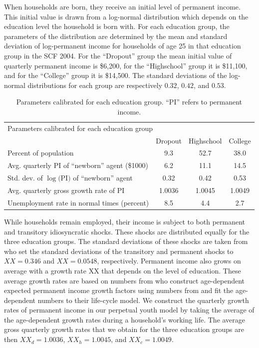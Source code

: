 \documentclass[11pt]{article}
\begin{document}
When households are born, they receive an initial level of permanent income. This initial value is drawn from a log-normal distribution which depends on the education level the household is born with. For each education group, the parameters of the distribution are determined by the mean and standard deviation of log-permanent income for households of age 25 in that education group in the SCF 2004. For the ``Dropout'' group the mean initial value of quarterly permanent income is \$6,200, for the ``Highschool'' group it is \$11,100, and for the ``College'' group it is \$14,500. The standard deviations of the log-normal distributions for each group are respectively $0.32$, $0.42$, and $0.53$. 

\begin{table}[th]
\begin{center}
	\begin{tabular}{lccc}
		\toprule 
		\multicolumn{4}{l}{Parameters calibrated for each education group} \\ 
		& Dropout & Highschool & College \\ \midrule
		Percent of population & \phantom{0}9.3 & 52.7 & 38.0 \\ 
		Avg. quarterly PI of ``newborn'' agent (\$1000) & \phantom{0}6.2 & 11.1 & 14.5 \\
		Std. dev. of $\log($PI$)$ of ``newborn'' agent & 0.32 & 0.42 & 0.53 \\
		Avg. quarterly gross growth rate of PI & 1.0036 & 1.0045 & 1.0049 \\
		Unemployment rate in normal times (percent) & \phantom{0}8.5 & \phantom{0}4.4 & \phantom{0}2.7  			
		\\ \bottomrule 
	\end{tabular}
	\caption{Parameters calibrated for each education group. ``PI'' refers to permanent income.}
	\label{tab:calibEd}
\end{center}
\end{table}

While households remain employed, their income is subject to both permanent and transitory idiosyncratic shocks. These shocks are distributed equally for the three education groups. The standard deviations of these shocks are taken from \citet{carroll2020sticky} who set the standard deviations of the transitory and permanent shocks to $XX=0.346$ and $XX=0.0548$, respectively. Permanent income also grows on average with a growth rate XX that depends on the level of education. These average growth rates are based on numbers from \citet{carroll2020modeling} who construct age-dependent expected permanent income growth factors using numbers from \citet{cagetti2003wealth} and fit the age-dependent numbers to their life-cycle model. We construct the quarterly growth rates of permanent income in our perpetual youth model by taking the average of the age-dependent growth rates during a household's working life. The average gross quarterly growth rates that we obtain for the three education groups are then $XX_d=1.0036$, $XX_h=1.0045$, and $XX_c=1.0049$.
\end{document}
